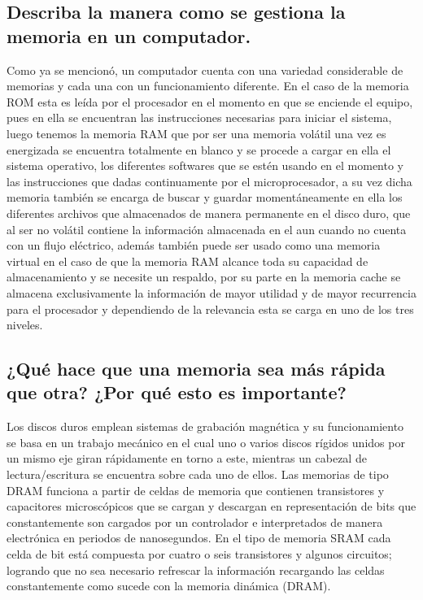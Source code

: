 \documentclass{article}
\begin{document}
\vspace{0.5cm}

\subsection{Describa la manera como se gestiona la memoria en un computador.}

Como ya se mencionó, un computador cuenta con una variedad considerable de memorias y cada una con un funcionamiento diferente. En el caso de la memoria ROM esta es leída por el procesador en el momento en que se enciende el equipo, pues en ella se encuentran las instrucciones necesarias para iniciar el sistema, luego tenemos la memoria RAM que por ser una memoria volátil una vez es energizada se encuentra totalmente en blanco y se procede a cargar en ella el sistema operativo, los diferentes softwares que se estén usando en el momento y las instrucciones que dadas continuamente por el microprocesador, a su vez dicha memoria también se encarga de buscar y guardar momentáneamente en ella los diferentes archivos que almacenados de manera permanente en el disco duro, que al ser no volátil contiene la información almacenada en el aun cuando no cuenta con un flujo eléctrico, además también puede ser usado como una memoria virtual en el caso de que la memoria RAM alcance toda su capacidad de almacenamiento y se necesite un respaldo, por su parte en la memoria cache se almacena exclusivamente la información de mayor utilidad y de mayor recurrencia para el procesador y dependiendo de la relevancia esta se carga en uno de los tres niveles.

\subsection{¿Qué hace que una memoria sea más rápida que otra? ¿Por qué esto es importante?}

Los discos duros emplean sistemas de grabación magnética y su funcionamiento se basa en un trabajo mecánico en el cual uno o varios discos rígidos unidos por un mismo eje giran rápidamente en torno a este, mientras un cabezal de lectura/escritura se encuentra sobre cada uno de ellos.
Las memorias de tipo DRAM funciona a partir de celdas de memoria que contienen transistores y capacitores microscópicos que se cargan y descargan en representación de bits que constantemente son cargados por un controlador e interpretados de manera electrónica en periodos de nanosegundos.
En el tipo de memoria SRAM cada celda de bit está compuesta por cuatro o seis transistores y algunos circuitos; logrando que no sea necesario refrescar la información recargando las celdas constantemente como sucede con la memoria dinámica (DRAM).
\end{document}
